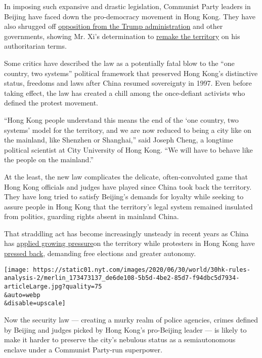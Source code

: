 In imposing such expansive and drastic legislation, Communist Party
leaders in Beijing have faced down the pro-democracy movement in Hong
Kong. They have also shrugged off
\href{https://www.nytimes.com/2020/05/27/us/politics/china-hong-kong-pompeo-trade.html}{opposition
from the Trump administration} and other governments, showing Mr. Xi's
determination to
\href{https://www.nytimes.com/2019/10/31/world/asia/hong-kong-protests-china.html}{remake
the territory} on his authoritarian terms.

Some critics have described the law as a potentially fatal blow to the
``one country, two systems'' political framework that preserved Hong
Kong's distinctive status, freedoms and laws after China resumed
sovereignty in 1997. Even before taking effect, the law has created a
chill among the once-defiant activists who defined the protest movement.

``Hong Kong people understand this means the end of the `one country,
two systems' model for the territory, and we are now reduced to being a
city like on the mainland, like Shenzhen or Shanghai,'' said Joseph
Cheng, a longtime political scientist at City University of Hong Kong.
``We will have to behave like the people on the mainland.''

At the least, the new law complicates the delicate, often-convoluted
game that Hong Kong officials and judges have played since China took
back the territory. They have long tried to satisfy Beijing's demands
for loyalty while seeking to assure people in Hong Kong that the
territory's legal system remained insulated from politics, guarding
rights absent in mainland China.

That straddling act has become increasingly unsteady in recent years as
China has
\href{https://www.nytimes.com/2014/09/01/world/asia/hong-kong-elections.html}{applied
growing pressure}on the territory while protesters in Hong Kong have
\href{https://www.nytimes.com/2014/09/29/world/asia/clashes-in-hong-kong.html}{pressed
back}, demanding free elections and greater autonomy.

\texttt{[image: https://static01.nyt.com/images/2020/06/30/world/30hk-rules-analysis-2/merlin\_173473137\_de6de108-5b5d-4be2-85d7-f94dbc5d7934-articleLarge.jpg?quality=75\\\&auto=webp\\\&disable=upscale]}

Now the security law --- creating a murky realm of police agencies,
crimes defined by Beijing and judges picked by Hong Kong's pro-Beijing
leader --- is likely to make it harder to preserve the city's nebulous
status as a semiautonomous enclave under a Communist Party-run
superpower.


